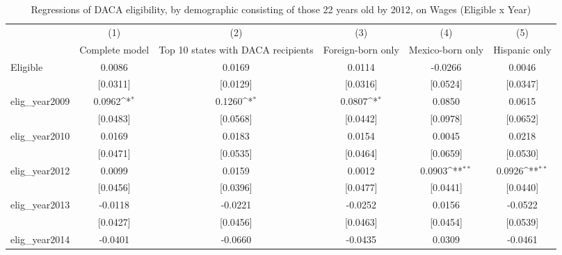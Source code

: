 \begin{table}[htbp]\centering
\def\sym#1{\ifmmode^{#1}\else\(^{#1}\)\fi}
\caption{Regressions of DACA eligibility, by demographic consisting of those 22 years old by 2012, on Wages (Eligible x Year)}
\begin{tabular}{l*{5}{c}}
\toprule
                    &\multicolumn{1}{c}{(1)}         &\multicolumn{1}{c}{(2)}         &\multicolumn{1}{c}{(3)}         &\multicolumn{1}{c}{(4)}         &\multicolumn{1}{c}{(5)}         \\
                    &Complete model         &Top 10 states with DACA recipients         &Foreign-born only         &Mexico-born only         &Hispanic only         \\
\midrule
Eligible            &      0.0086         &      0.0169         &      0.0114         &     -0.0266         &      0.0046         \\
                    &    [0.0311]         &    [0.0129]         &    [0.0316]         &    [0.0524]         &    [0.0347]         \\
\addlinespace
elig\_year2009       &      0.0962\sym{*}  &      0.1260\sym{*}  &      0.0807\sym{*}  &      0.0850         &      0.0615         \\
                    &    [0.0483]         &    [0.0568]         &    [0.0442]         &    [0.0978]         &    [0.0652]         \\
\addlinespace
elig\_year2010       &      0.0169         &      0.0183         &      0.0154         &      0.0045         &      0.0218         \\
                    &    [0.0471]         &    [0.0535]         &    [0.0464]         &    [0.0659]         &    [0.0530]         \\
\addlinespace
elig\_year2012       &      0.0099         &      0.0159         &      0.0012         &      0.0903\sym{**} &      0.0926\sym{**} \\
                    &    [0.0456]         &    [0.0396]         &    [0.0477]         &    [0.0441]         &    [0.0440]         \\
\addlinespace
elig\_year2013       &     -0.0118         &     -0.0221         &     -0.0252         &      0.0156         &     -0.0522         \\
                    &    [0.0427]         &    [0.0456]         &    [0.0463]         &    [0.0454]         &    [0.0539]         \\
\addlinespace
elig\_year2014       &     -0.0401         &     -0.0660         &     -0.0435         &      0.0309         &     -0.0461         \\

\end{tabular}
\end{table}
